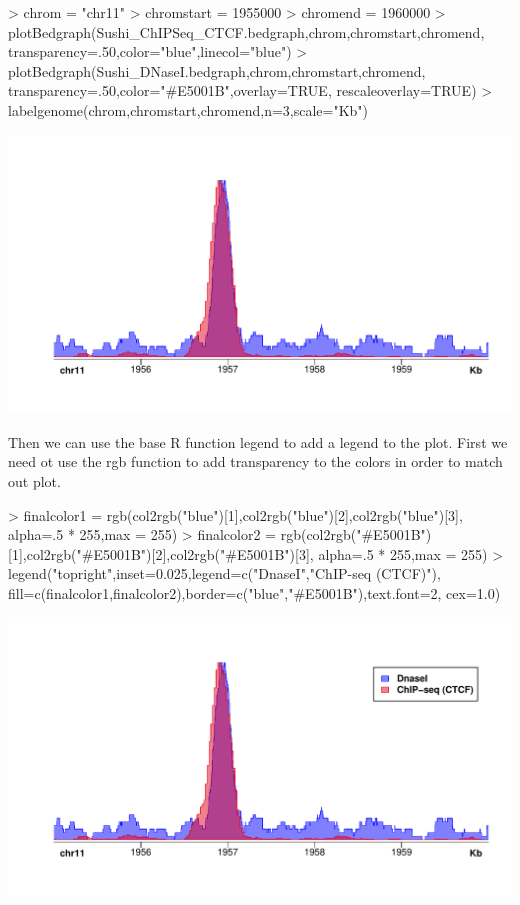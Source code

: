 \documentclass{article}
\begin{document}
\begin{center}
\begin{Schunk}
\begin{Sinput}
> chrom            = "chr11"
> chromstart       = 1955000
> chromend         = 1960000
> plotBedgraph(Sushi_ChIPSeq_CTCF.bedgraph,chrom,chromstart,chromend,
              transparency=.50,color="blue",linecol="blue")
> plotBedgraph(Sushi_DNaseI.bedgraph,chrom,chromstart,chromend,
              transparency=.50,color="#E5001B",overlay=TRUE,
              rescaleoverlay=TRUE)
> labelgenome(chrom,chromstart,chromend,n=3,scale="Kb")
\end{Sinput}
\end{Schunk}
\includegraphics{Sushi-010}
\end{center}

Then we can use the base R function legend to add a legend to the plot.  First we need ot use the rgb function to add transparency to the colors in order to match out plot.

\begin{center}

\begin{Schunk}
\begin{Sinput}
> finalcolor1 = rgb(col2rgb("blue")[1],col2rgb("blue")[2],col2rgb("blue")[3],
                   alpha=.5 * 255,max = 255)
> finalcolor2 = rgb(col2rgb("#E5001B")[1],col2rgb("#E5001B")[2],col2rgb("#E5001B")[3],
                   alpha=.5 * 255,max = 255)
> legend("topright",inset=0.025,legend=c("DnaseI","ChIP-seq (CTCF)"),
        fill=c(finalcolor1,finalcolor2),border=c("blue","#E5001B"),text.font=2,
        cex=1.0)
\end{Sinput}
\end{Schunk}
\includegraphics{Sushi-012}

\end{center}
\end{document}
